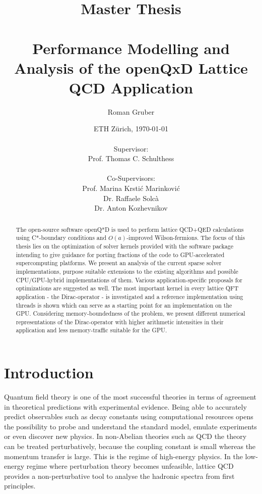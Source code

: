 \documentclass{article}
\title{Master Thesis \\~\\ Performance Modelling and Analysis of the openQxD Lattice QCD Application}
\author{Roman Gruber}
\date{ETH Zürich, \today \\~\\ Supervisor: \\ Prof. Thomas C. Schulthess \\~\\ Co-Supervisors: \\ Prof. Marina Krstić Marinković \\ Dr. Raffaele Solcà \\ Dr. Anton Kozhevnikov}
\theoremstyle{plain} %
\theoremstyle{convention} %
\theoremstyle{remark} %
\numberwithin{equation}{section}
\begin{document}
\maketitle

\begin{abstract}

The open-source software openQ*D is used to perform lattice QCD+QED calculations using C*-boundary conditions and $O(a)$-improved Wilson-fermions. The focus of this thesis lies on the optimization of solver kernels provided with the software package intending to give guidance for porting fractions of the code to GPU-accelerated supercomputing platforms. We present an analysis of the current sparse solver implementations, purpose suitable extensions to the existing algorithms and possible CPU/GPU-hybrid implementations of them.  Various application-specific proposals for optimizations are suggested as well. The most important kernel in every lattice QFT application - the Dirac-operator - is investigated and a reference implementation using threads is shown which can serve as a starting point for an implementation on the GPU. Considering memory-boundedness of the problem, we present different numerical representations of the Dirac-operator with higher arithmetic intensities in their application and less memory-traffic suitable for the GPU.

\end{abstract}

\doclicenseThis

\newpage

\tableofcontents

\newpage

\section{Introduction}

Quantum field theory is one of the most successful theories in terms of agreement in theoretical predictions with experimental evidence. Being able to accurately predict observables such as decay constants using computational resources opens the possibility to probe and understand the standard model, emulate experiments or even discover new physics. In non-Abelian theories such as \acrshort{QCD} the theory can be treated perturbatively, because the coupling constant is small whereas the momentum transfer is large. This is the regime of high-energy physics. In the low-energy regime where perturbation theory becomes unfeasible, lattice QCD provides a non-perturbative tool to analyse the hadronic spectra from first principles.
\end{document}
